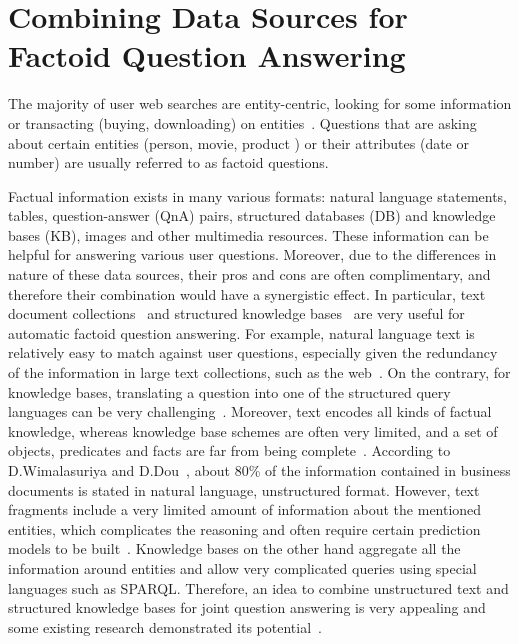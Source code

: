 %

\chapter{Combining Data Sources for Factoid Question Answering}
\label{chapter:factoid}

\noindent

The majority of user web searches are entity-centric, \ie looking for some information or transacting (\eg buying, downloading) on entities~\cite{pound2010ad}.
Questions that are asking about certain entities (\eg person, movie, product \etc) or their attributes (\eg date or number) are usually referred to as factoid questions.

Factual information exists in many various formats: natural language statements, tables, question-answer (QnA) pairs, structured databases (DB) and knowledge bases (KB), images and other multimedia resources.
These information can be helpful for answering various user questions.
Moreover, due to the differences in nature of these data sources, their pros and cons are often complimentary, and therefore their combination would have a synergistic effect.
In particular, text document collections~\cite{Kolomiyets:2011:SQA:2046840.2047162} and structured knowledge bases~\cite{unger2014introduction} are very useful for automatic factoid question answering.
For example, natural language text is relatively easy to match against user questions, especially given the redundancy of the information in large text collections, such as the web~\cite{lin2007exploration}.
On the contrary, for knowledge bases, translating a question into one of the structured query languages can be very challenging~\cite{BerantCFL13:sempre}.
Moreover, text encodes all kinds of factual knowledge, whereas knowledge base schemes are often very limited, and a set of objects, predicates and facts are far from being complete~\cite{Dong:2014:KVW:2623330.2623623}.
According to D.Wimalasuriya and D.Dou~\cite{wimalasuriya2010ontology}, about 80\% of the information contained in business documents is stated in natural language, \ie unstructured format.
However, text fragments include a very limited amount of information about the mentioned entities, which complicates the reasoning and often require certain prediction models to be built~\cite{LiRoth02}.
Knowledge bases on the other hand aggregate all the information around entities and allow very complicated queries using special languages such as SPARQL.
Therefore, an idea to combine unstructured text and structured knowledge bases for joint question answering is very appealing and some existing research demonstrated its potential~\cite{baudivs2015yodaqa,elbassuoni2009language,fader2013paraphrase,ferrucci2010building,Sun:2015:ODQ:2736277.2741651}.

